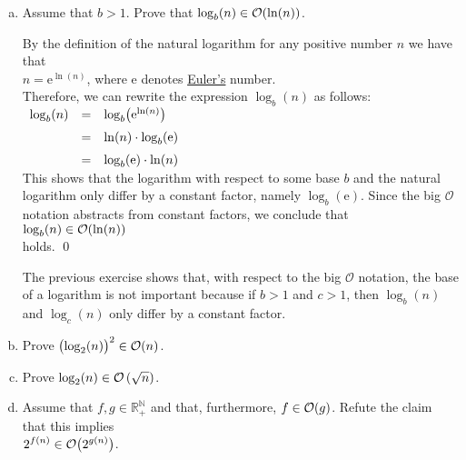\exercise
\begin{enumerate}[(a)]
\item Assume that $b > 1$.  Prove that $\log_{b}(n) \in \mathcal{O}(\ln(n))$.

      \solution
      By the definition of the natural logarithm for any positive number $n$ we have that
      \\[0.2cm]
      \hspace*{1.3cm}
      $n = \mathrm{e}^{\ln(n)}$, \quad where
      \href{http://en.wikipedia.org/wiki/E_(mathematical_constant)}{$\mathrm{e}$} denotes
      \href{https://en.wikipedia.org/wiki/Leonhard_Euler}{Euler's} number. 
      \\[0.2cm]
      Therefore, we can rewrite the expression $\log_b(n)$
      as follows:
      \\[0.2cm]
      \hspace*{1.3cm}
      $
      \begin{array}[t]{lcl}
        \log_b(n) & = & \log_b\bigl(\mathrm{e}^{\ln(n)}\bigr) \\[0.2cm]
                  & = & \ln(n) \cdot \log_b(\mathrm{e})      \\[0.2cm]
                  & = & \log_b(\mathrm{e}) \cdot \ln(n)
      \end{array}
      $
      \\[0.2cm]
      This shows that the logarithm with respect to some base $b$ and the natural logarithm 
      only differ by a constant factor, namely $\log_b(\mathrm{e})$.  Since the big $\mathcal{O}$ notation abstracts from
      constant factors, we conclude that
      \\[0.2cm]
      \hspace*{1.3cm}
      $\log_{b}(n) \in \mathcal{O}(\ln(n))$
      \\[0.2cm]
      holds. \qed

      \remark
      The previous exercise shows that, with respect to the big $\mathcal{O}$ notation, the base of
      a logarithm is not important because if $b > 1$ and $c > 1$, then $\log_{b}(n)$ and $ \log_{c}(n)$
      only differ by a constant factor.
\item Prove $\bigl(\log_2(n)\bigr)^2 \in \mathcal{O}(n)$.
\item Prove  $\log_2(n) \in \mathcal{O}\left(\sqrt{n}\right)$.
\item Assume that $f, g \in \mathbb{R}_+^\mathbb{N}$ and that, furthermore, $f \in \mathcal{O}(g)$.  
      Refute the claim that this implies 
      \\[0.2cm]
      \hspace*{1.3cm}
      $\displaystyle 2^{f(n)} \in \mathcal{O}\bigl(2^{g(n)}\bigr)$. \eox
\end{enumerate}
    
